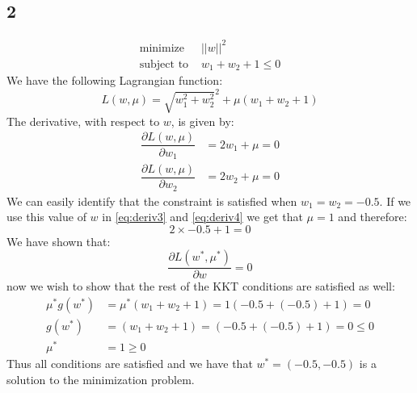 \documentclass{article}
\begin{document}
\subsection{2}
\begin{align}
\text{minimize } &||w||^2 \\
\text{subject to } &w_1 + w_2 + 1 \leq 0
\end{align}
We have the following Lagrangian function:
\begin{equation}
L(w,\mu) = \sqrt{w_1^2 + w_2^2}^2 + \mu(w_1 + w_2 + 1)
\end{equation}
The derivative, with respect to $w$, is given by:
\begin{align}
\label{eq:deriv3}
\dfrac{\partial L (w, \mu)}{\partial w_1} &= 2 w_1 + \mu = 0 \\
\label{eq:deriv4}
\dfrac{\partial L (w, \mu)}{\partial w_2} &= 2 w_2 +\mu = 0
\end{align}
We can easily identify that the constraint is satisfied when $w_1 = w_2 = -0.5$. If we use this value of $w$ in \eqref{eq:deriv3} and \eqref{eq:deriv4} we get that $\mu = 1$ and therefore:
\begin{equation}
2 \times -0.5 + 1 = 0 
\end{equation}
We have shown that:
\begin{equation}
\dfrac{\partial L (w^*, \mu^*)}{\partial w} = 0
\end{equation}
now we wish to show that the rest of the KKT conditions are satisfied as well:
\begin{align}
\mu^* g(w^*) &= \mu^* (w_1 + w_2 + 1) = 1 (-0.5 +(-0.5) + 1) = 0 \\
g(w^*) &= (w_1 + w_2 + 1) = (-0.5 + (-0.5) + 1) = 0 \leq 0 \\
\mu^* &= 1 \geq 0
\end{align}
Thus all conditions are satisfied and we have that $w^* = (-0.5,-0.5)$ is a solution to the minimization problem.
\end{document}
